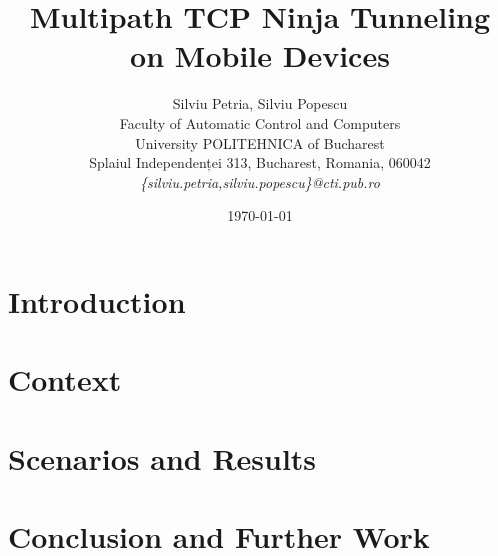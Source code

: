 \documentclass[12pt]{article}
\title{Multipath TCP Ninja Tunneling on Mobile Devices}
\author{Silviu Petria, Silviu Popescu\\
Faculty of Automatic Control and Computers\\
University POLITEHNICA of Bucharest\\
Splaiul Independenței 313, Bucharest, Romania, 060042 \\
\emph{\{silviu.petria,silviu.popescu\}@cti.pub.ro}}
\date{\today}
\begin{document}
\maketitle

\begin{abstract}

\end{abstract}

\section{Introduction}
\label{sec:introduction}


\section{Context}
\label{sec:context}


\section{Scenarios and Results}
\label{sec:results}


\section{Conclusion and Further Work}
\label{sec:conclusion}




\end{document}

